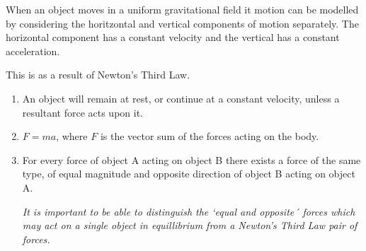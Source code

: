 \documentclass[main.tex]{subfiles}
\begin{document}
When an object moves in a uniform gravitational field it motion can be modelled by considering the horitzontal and vertical components of motion separately. The horizontal component has a constant velocity and the vertical has a constant acceleration.



This is as a result of Newton's Third Law.

\begin{enumerate}
	\item An object will remain at rest, or continue at a constant velocity, unless a resultant force acts upon it.
	\item $F=ma$, where $F$ is the vector sum of the forces acting on the body.
	\item For every force of object A acting on object B there exists a force of the same type, of equal magnitude and opposite direction of object B acting on object A.

	\emph{It is important to be able to distinguish the `equal and opposite´ forces which may act on a single object in equillibrium from a Newton's Third Law pair of forces.}
\end{enumerate}
\end{document}
